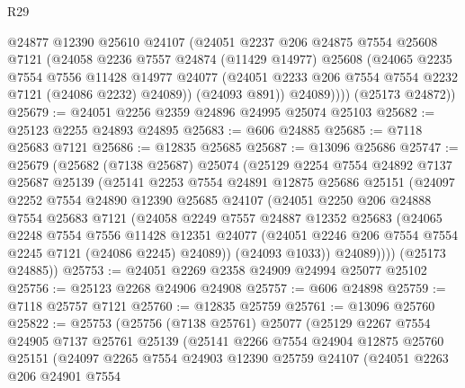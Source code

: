 \begin{lexlean}{R29}
\begin{coremodule}
            @24877
            @12390
            @25610
            @24107
            (@24051
              @2237
              @206
              @24875
              @7554
              @25608
              @7121
              (@24058
                @2236
                @7557
                @24874
                (@11429 @14977)
                @25608
                (@24065
                  @2235
                  @7554
                  @7556
                  @11428
                  @14977
                  @24077
                  (@24051 @2233 @206 @7554 @7554 @2232 @7121 (@24086 @2232) @24089))
                (@24093 @891))
              @24089))))
      (@25173 @24872))
@25679 := @24051 @2256 @2359 @24896 @24995 @25074 @25103
@25682 := @25123 @2255 @24893 @24895
@25683 := @606 @24885
@25685 := @7118 @25683 @7121
@25686 := @12835 @25685
@25687 := @13096 @25686
@25747 := @25679
    (@25682
      (@7138 @25687)
      @25074
      (@25129
        @2254
        @7554
        @24892
        @7137
        @25687
        @25139
        (@25141
          @2253
          @7554
          @24891
          @12875
          @25686
          @25151
          (@24097
            @2252
            @7554
            @24890
            @12390
            @25685
            @24107
            (@24051
              @2250
              @206
              @24888
              @7554
              @25683
              @7121
              (@24058
                @2249
                @7557
                @24887
                @12352
                @25683
                (@24065
                  @2248
                  @7554
                  @7556
                  @11428
                  @12351
                  @24077
                  (@24051 @2246 @206 @7554 @7554 @2245 @7121 (@24086 @2245) @24089))
                (@24093 @1033))
              @24089))))
      (@25173 @24885))
@25753 := @24051 @2269 @2358 @24909 @24994 @25077 @25102
@25756 := @25123 @2268 @24906 @24908
@25757 := @606 @24898
@25759 := @7118 @25757 @7121
@25760 := @12835 @25759
@25761 := @13096 @25760
@25822 := @25753
    (@25756
      (@7138 @25761)
      @25077
      (@25129
        @2267
        @7554
        @24905
        @7137
        @25761
        @25139
        (@25141
          @2266
          @7554
          @24904
          @12875
          @25760
          @25151
          (@24097
            @2265
            @7554
            @24903
            @12390
            @25759
            @24107
            (@24051
              @2263
              @206
              @24901
              @7554

\end{coremodule}
\end{lexlean}
